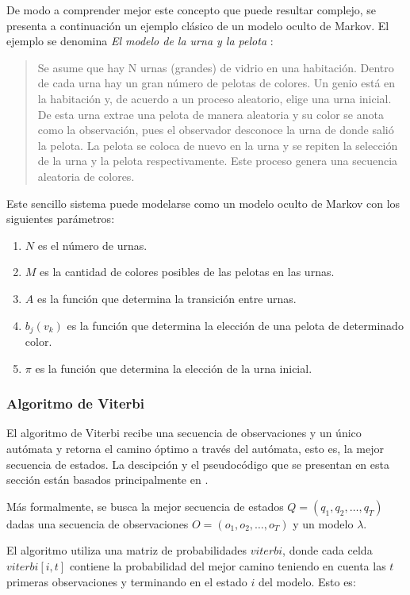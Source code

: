De modo a comprender mejor este concepto que puede resultar complejo, se presenta a continuaci\'on un ejemplo cl\'asico de un modelo oculto de
Markov. El ejemplo se denomina \emph{El modelo de la urna y la pelota} \cite{Rabiner89atutorial}:

\begin{quote}
	Se asume que hay N urnas (grandes) de vidrio en una habitaci\'on. Dentro de cada urna hay un gran n\'umero de pelotas de colores.
	Un genio est\'a en la habitaci\'on y, de acuerdo a un proceso aleatorio, elige una urna inicial. De esta urna extrae una pelota de
	manera aleatoria y su color se anota como la observaci\'on, pues el observador desconoce la urna de donde sali\'o la pelota.
	La pelota se coloca de nuevo en la urna y se repiten la selecci\'on de la urna y la pelota respectivamente. Este proceso genera
	una secuencia aleatoria de colores.
\end{quote}

Este sencillo sistema puede modelarse como un modelo oculto de Markov con los siguientes par\'ametros:
\begin{enumerate}
	\item $N$ es el n\'umero de urnas.
	\item $M$ es la cantidad de colores posibles de las pelotas en las urnas.
	\item $A$ es la funci\'on que determina la transici\'on entre urnas.
	\item $b_j(v_k)$ es la funci\'on que determina la elecci\'on de una pelota de determinado color.
	\item $\pi$ es la funci\'on que determina la elecci\'on de la urna inicial.
\end{enumerate}

\subsubsection{Algoritmo de Viterbi}
El algoritmo de Viterbi recibe una secuencia de observaciones y un \'unico aut\'omata y retorna el camino \'optimo a trav\'es
del aut\'omata, esto es, la mejor secuencia de estados. La descipci\'on y el pseudoc\'odigo que se presentan en esta secci\'on
est\'an basados principalmente en \cite{Jurafsky, Rabiner89atutorial}.

M\'as formalmente, se busca la mejor secuencia de estados $Q = (q_1,q_2,\ldots,q_T)$ dadas una secuencia de observaciones
$O = (o_1,o_2,\ldots,o_T)$ y un modelo $\lambda$.

El algoritmo utiliza una matriz de probabilidades $viterbi$, donde cada celda $viterbi[i,t]$ contiene la probabilidad del
mejor camino teniendo en cuenta las $t$ primeras observaciones y terminando en el estado $i$ del modelo. Esto es:

